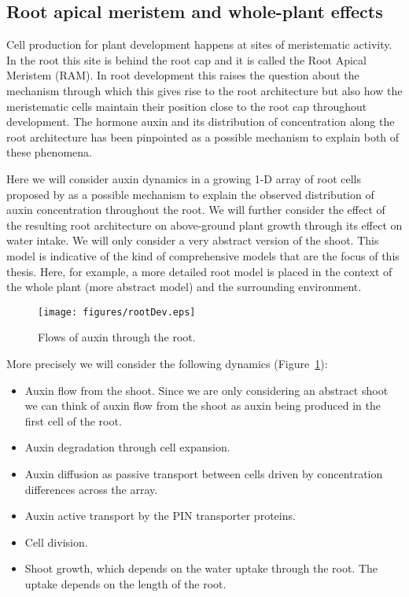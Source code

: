 \subsection{Root apical meristem and whole-plant effects}
\label{sec:rootDev}
Cell production for plant development happens at sites of meristematic
activity. In the root this site is behind the root cap and it is called the Root
Apical Meristem (RAM). In root development this raises the question about the
mechanism through which this gives rise to the root architecture but also how
the meristematic cells maintain their position close to the root cap throughout
development. The hormone auxin and its distribution of concentration along the
root architecture has been pinpointed as a possible mechanism to explain both of
these phenomena.

Here we will consider auxin dynamics in a growing 1-D array of root cells
proposed by \citet{mironova_plausible_2010} as a possible mechanism to explain
the observed distribution of auxin concentration throughout the root. We will
further consider the effect of the resulting root architecture on above-ground
plant growth through its effect on water intake. We will only consider a very
abstract version of the shoot. This model is indicative of the kind of
comprehensive models that are the focus of this thesis. Here, for example, a
more detailed root model is placed in the context of the whole plant (more
abstract model) and the surrounding environment.

\begin{figure}
\centering
\texttt{[image: figures/rootDev.eps]}
\caption{Flows of auxin through the root.}
\label{fig:rootDev}
\end{figure}

More precisely we will consider the following dynamics
(Figure~\ref{fig:rootDev}):
\begin{itemize}
\item Auxin flow from the shoot. Since we are only considering an abstract shoot
  we can think of auxin flow from the shoot as auxin being produced in the first
  cell of the root.
\item Auxin degradation through cell expansion.
\item Auxin diffusion as passive transport between cells driven by concentration
  differences across the array.
\item Auxin active transport by the PIN transporter proteins.
\item Cell division.
\item Shoot growth, which depends on the water uptake through the root. The
  uptake depends on the length of the root.
\end{itemize}



